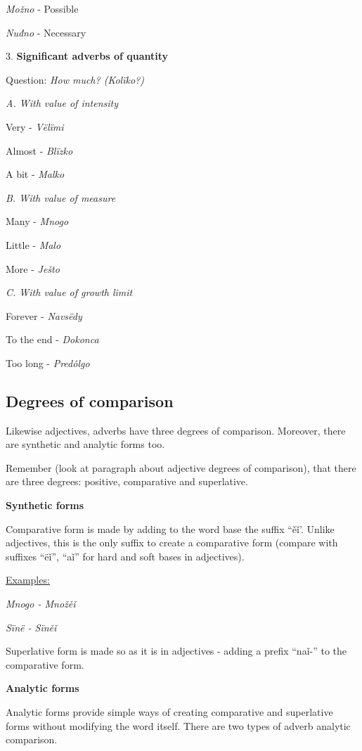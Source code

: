 \textit{Možno} - Possible

\textit{Nuđno} - Necessary

3.\textbf{ Significant adverbs of quantity}

Question: \textit{How much? (Kolïko?)}

\textit{A. With value of intensity}

Very - \textit{Vëlïmi}

Almost - \textit{Blïzko}

A bit - \textit{Malko}

\textit{B. With value of measure}

Many - \textit{Mnogo}

Little - \textit{Malo}

More - \textit{Ješto}

\textit{C. With value of growth limit}

Forever - \textit{Navsëdy}

To the end - \textit{Dokonca}

Too long - \textit{Predôlgo}

\subsection{Degrees of comparison}

Likewise adjectives, adverbs have three degrees of comparison. Moreover, there are synthetic and analytic forms too. 

Remember (look at paragraph about adjective degrees of comparison), that there are three degrees: positive, comparative and superlative.

\textbf{Synthetic forms}

Comparative form is made by adding to the word base the suffix “ěǐ’. Unlike adjectives, this is the only suffix to create a comparative form (compare with suffixes “ëǐ”, “aǐ” for hard and soft bases in adjectives). 

\underline{Examples:}

\textit{Mnogo - Množěǐ}

\textit{Sïnë - Sïněǐ}

Superlative form is made so as it is in adjectives - adding a prefix “naǐ-” to the comparative form.

\textbf{Analytic forms}

Analytic forms provide simple ways of creating comparative and superlative forms without modifying the word itself. There are two types of adverb analytic comparison.


